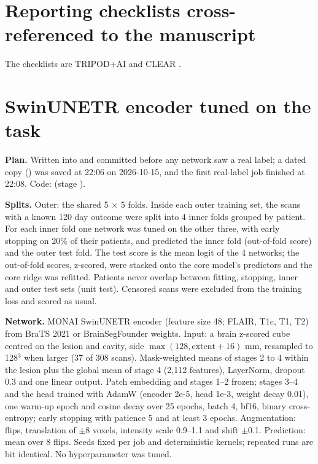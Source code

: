 \documentclass[11pt,a4paper]{article}
\begin{document}
\FloatBarrier
\section[Reporting checklists (TRIPOD+AI, CLEAR) cross-referenced to the manuscript]{Reporting checklists
cross-referenced to the manuscript}\label{sec:S17}

The checklists are TRIPOD+AI \citep{collins2024} and CLEAR \citep{kocak2023}.


\FloatBarrier
\section{SwinUNETR encoder tuned on the task}\label{sec:S22}

\textbf{Plan.} Written into  and committed before any network saw a
real label; a dated copy () was saved at 22:06 on 2026-10-15, and the first real-label job
finished at 22:08. Code:  (stage ).

\textbf{Splits.} Outer: the shared 5 $\times$ 5 folds. Inside each outer training set, the scans with a known
120 day outcome were split into 4 inner folds grouped by patient. For each inner fold one network was tuned on the
other three, with early stopping on 20\% of their patients, and predicted the inner fold (out-of-fold score) and the
outer test fold. The test score is the mean logit of the 4 networks; the out-of-fold scores, z-scored, were stacked
onto the core model's predictors and the core ridge was refitted. Patients never overlap between fitting, stopping,
inner and outer test sets (unit test). Censored scans were excluded from the training loss and scored as usual.

\textbf{Network.} MONAI \citep{cardoso2022monai} SwinUNETR encoder (feature size 48; FLAIR, T1c, T1, T2) from BraTS 2021 or BrainSegFounder
weights. Input: a brain z-scored cube centred on the lesion and cavity, side $\max(128, \text{extent} + 16)$ mm,
resampled to 128$^3$ when larger (37 of 308 scans). Mask-weighted means of stages 2 to 4 within the lesion plus the
global mean of stage 4 (2,112 features), LayerNorm, dropout 0.3 and one linear output. Patch embedding and stages 1--2
frozen; stages 3--4 and the head trained with AdamW \citep{loshchilov2019} (encoder 2e-5, head 1e-3, weight decay 0.01), one warm-up epoch
and cosine decay over 25 epochs, batch 4, bf16, binary cross-entropy; early stopping with patience 5 and at least 3
epochs. Augmentation: flips, translation of $\pm$8 voxels, intensity scale 0.9--1.1 and shift $\pm$0.1. Prediction:
mean over 8 flips. Seeds fixed per job and deterministic kernels; repeated runs are bit identical. No hyperparameter
was tuned.
\end{document}
